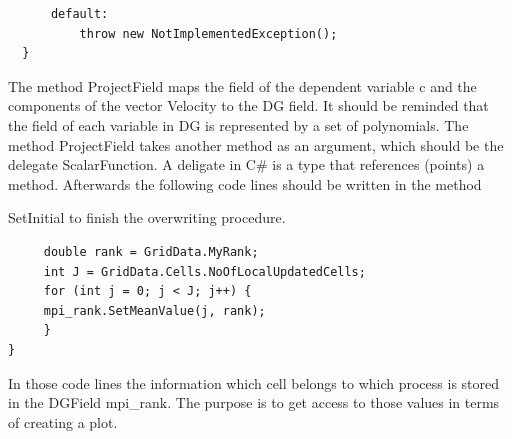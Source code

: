 \documentclass[11pt,twoside,a4paper]{fdyartcl}
\begin{document}
{{\begin{verbatim}
	  default:
		  throw new NotImplementedException();
  }  
\end{verbatim}}
The method {\scriptsize ProjectField} maps the field of the dependent variable {\scriptsize c} and the components of the vector {\scriptsize Velocity} to the DG field. It should be reminded that the field of each variable in DG is represented by a set of polynomials. The method {\scriptsize ProjectField} takes another method as an argument, which should be the delegate {\scriptsize ScalarFunction}. A deligate in C\# is a type that references (points) a method. Afterwards the following code lines should be written in the method {{\scriptsize SetInitial} to finish the overwriting procedure.
{\scriptsize \begin{verbatim}
     double rank = GridData.MyRank;
     int J = GridData.Cells.NoOfLocalUpdatedCells;
     for (int j = 0; j < J; j++) {
     mpi_rank.SetMeanValue(j, rank);
     }
}
\end{verbatim}}
In those code lines the information which cell belongs to which process is stored in the DGField {\scriptsize mpi\_rank}. The purpose is to get access to those values in terms of creating a plot.
}}
\end{document}
